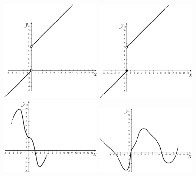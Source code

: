 \begin{itemize}
\begin{figure}[htpb!]
\quad\includegraphics[width=0.45\textwidth]{img/funz_17a.png}   
  
\quad\includegraphics[width=0.45\textwidth]{img/funz_17b.png}   
  
\quad\includegraphics[width=0.45\textwidth]{img/funz_17c.png}   
  
\quad\includegraphics[width=0.45\textwidth]{img/funz_17d.png}
  \end{figure}
  \end{itemize}

